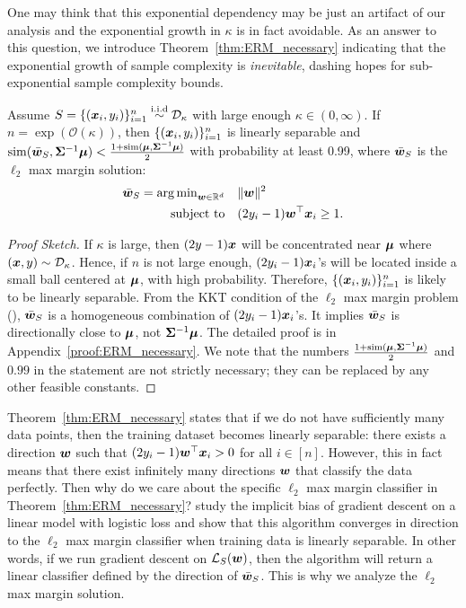 One may think that this exponential dependency may be just an artifact of our analysis and the exponential growth in $\kappa$ is in fact avoidable.
As an answer to this question, we introduce Theorem~\ref{thm:ERM_necessary} indicating that the exponential growth of sample complexity is \emph{inevitable}, dashing hopes for sub-exponential sample complexity bounds.
\begin{theorem}\label{thm:ERM_necessary}
Assume $S = \{({\bm{x}}_i, y_i)\}_{i=1}^n\overset{\mathrm{i.i.d}}{\sim} \mathcal{D}_\kappa$ with large enough $\kappa \in (0, \infty)$. If $n = \exp (\mathcal{O}(\kappa))$, then $\{({\bm{x}}_i, y_i) \}_{i=1}^n$ is linearly separable and $\mathrm{sim}(\bar{{\bm{w}}}_S, {\bm{\Sigma}}^{-1}{\bm{\mu}}) < \frac{1+\mathrm{sim}({\bm{\mu}},{\bm{\Sigma}}^{-1}{\bm{\mu}})}{2}$ with probability at least 0.99, where $\bar{{\bm{w}}}_S$ is the $\ell_2$ max margin solution: 
\begin{equation}
\label{eq:2}
\begin{aligned}
    \bar{{\bm{w}}}_S = \operatorname*{arg\,min}\nolimits_{{\bm{w}} \in \mathbb{R}^d} &\quad\lVert {\bm{w}} \rVert^2 \\
    \mathrm{subject~to }&\quad(2y_i-1){\bm{w}}^\top {\bm{x}}_i \geq 1.
\end{aligned}
\end{equation}
\end{theorem}
\begin{proof}[Proof Sketch]
If $\kappa$ is large, then $(2y-1){\bm{x}}$ will be concentrated near ${\bm{\mu}}$ where $({\bm{x}},y) \sim \mathcal{D}_\kappa$. Hence, if $n$ is not large enough, $(2y_i-1){\bm{x}}_i$'s will be located inside a small ball centered at ${\bm{\mu}}$, with high probability. Therefore, $\{({\bm{x}}_i, y_i)\}_{i=1}^n$ is likely to be linearly separable. From the KKT condition of the $\ell_2$ max margin problem (), $\bar{{\bm{w}}}_S$ is a homogeneous combination of $(2y_i-1){\bm{x}}_i$'s. It implies $\bar{{\bm{w}}}_S$ is directionally close to ${\bm{\mu}}$, not ${\bm{\Sigma}}^{-1} {\bm{\mu}}$. The detailed proof is in Appendix~\ref{proof:ERM_necessary}.
We note that the numbers $\frac{1+ \mathrm{sim}({\bm{\mu}}, {\bm{\Sigma}}^{-1}{\bm{\mu}})}{2}$ and $0.99$ in the statement are not strictly necessary; they can be replaced by any other feasible constants.
\end{proof}

Theorem~\ref{thm:ERM_necessary} states that if we do not have sufficiently many data points, then the training dataset becomes linearly separable: there exists a direction ${\bm{w}}$ such that $(2y_i-1) {\bm{w}}^\top {\bm{x}}_i > 0$ for all $i \in [n]$. However, this in fact means that there exist infinitely many directions ${\bm{w}}$ that classify the data perfectly. Then why do we care about the specific $\ell_2$ max margin classifier in Theorem~\ref{thm:ERM_necessary}? \citet{soudry2018implicit, ji2019implicit} study the implicit bias of gradient descent on a linear model with logistic loss and show that this algorithm converges in direction to the $\ell_2$ max margin classifier when training data is linearly separable. In other words, if we run gradient descent on $\mathcal{L}_S({\bm{w}})$, then the algorithm will return a linear classifier defined by the direction of $\bar{{\bm{w}}}_S$. This is why we analyze the $\ell_2$ max margin solution.
\vspace{-5pt}
